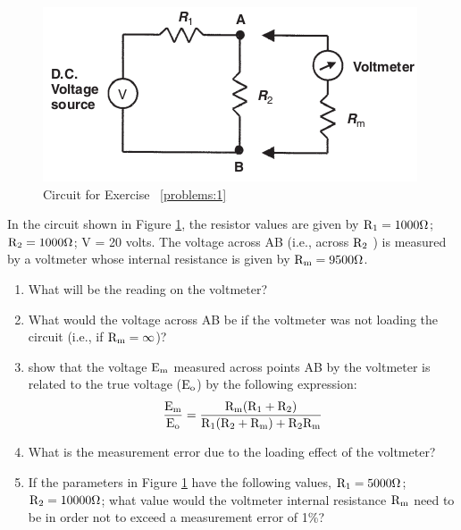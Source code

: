 \documentclass[a4paper,11pt]{book}
\begin{document}
\begin{question}\label{problems:1}

\begin{figure}[h!]\label{fig:problem}
\centering
  \includegraphics[width=0.8\linewidth]{problem}
  \caption{Circuit for Exercise ~\ref{problems:1}} 
\end{figure}

In the circuit shown in Figure \ref{fig:problem}, the resistor values are given by $\rm R_1 = 1000 \Omega$; $ \rm R_2 = 1000 \Omega$; V = 20 volts. The voltage across AB (i.e., across $\rm R_2$ ) is measured by a
voltmeter whose internal resistance is given by $\rm R_m = 9500 \Omega$.
\begin{enumerate}
\item What will be the reading on the voltmeter?
\item What would the voltage across AB be if the voltmeter was not loading the circuit (i.e., if $\rm R_m = \infty $)?
\item show that the voltage $\rm E_m$ measured across points AB by the voltmeter is related to the true voltage ($\rm E_o$) by the following expression:
\begin{equation}
\rm \frac{E_m}{E_o} = \frac{R_m( R_1 + R_2 )}{R_1(R_2+R_m)+R_2 R_m}
\end{equation}
\item What is the measurement error due to the loading effect of the voltmeter?
\item If the parameters in Figure \ref{fig:problem} have the following values, $\rm R_1 = 5000 \Omega$; $\rm R_2 = 10000 \Omega$; what value would the voltmeter internal resistance $\rm R_m$ need to be in order not to exceed a measurement error of 1\%?
\end{enumerate}
\examspace*{20em}

\end{question}
\begin{solution}


\end{solution}
\end{document}
